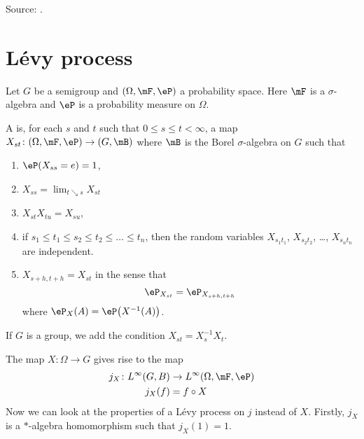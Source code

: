 

Source: \cite{UweLevy}.

\section{Lévy process}

Let $G$ be a semigroup and $(\Omega,\mF,\eP)$ a probability space. Here $\mF$ is a $\sigma$-algebra and $\eP$ is a probability measure on $\Omega$.
\begin{definition}
	A  is, for each $s$ and $t$ such that $0\leq s\leq t<\infty$, a map $X_{st}\colon (\Omega,\mF,\eP)\to (G,\mB)$ where $\mB$ is the Borel $\sigma$-algebra on $G$ such that
	\begin{enumerate}
		\item
		      $\eP(X_{ss}=e)=1$,
		\item
		      $X_{ss}=\lim_{t\searrow s}X_{st}$
		\item
		      $X_{st}X_{tu}=X_{su}$,
		\item
		      if $s_1\leq t_1\leq s_2\leq t_2\leq \ldots\leq t_n$, then the random variables $X_{s_1t_1}$, $X_{s_2t_2}$, \ldots, $X_{s_nt_n}$ are independent.
		\item
		      $X_{s+h,t+h}=X_{st}$ in the sense that
		      \begin{equation}
			      \eP_{X_{st}}=\eP_{X_{s+h,t+h}}
		      \end{equation}
		      where $\eP_X(A)=\eP\big( X^{-1}(A) \big)$.
	\end{enumerate}
	If $G$ is a group, we add the condition $X_{st}=X_s^{-1}X_t$.
\end{definition}

The map $X\colon \Omega\to G$ gives rise to the map
\begin{equation}
	\begin{aligned}
		j_X\colon L^{\infty}(G,B) & \to L^{\infty}(\Omega,\mF,\eP) \\
		j_X(f)                    & =f\circ X
	\end{aligned}
\end{equation}
Now we can look at the properties of a Lévy process on $j$ instead of $X$. Firstly, $j_X$ is a $*$-algebra homomorphism such that $j_X(1)=1$.

